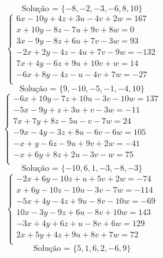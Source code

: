 \documentclass[12pt,oneside,a4paper]{article}
\begin{document}
\begin{equation*}
\text{Solução = }\{-8,-2,-3,-6,8,10\}
\end{equation*}
\vspace{\baselineskip}
\begin{equation*}
\begin{cases}
6x-10y+4z+3u-4v+2w=167 \\
x+10y-8z-7u+9v+8w=0 \\
3x-9y-8z+6u+7v-3w=93 \\
-2x+2y-4z-4u+7v-9w=-132 \\
7x+4y-6z+9u+10v+w=14 \\
-6x+8y-4z-u-4v+7w=-27 \\
\end{cases}
\end{equation*}
\begin{equation*}
\text{Solução = }\{9,-10,-5,-1,-4,10\}
\end{equation*}
\vspace{\baselineskip}
\begin{equation*}
\begin{cases}
-6x+10y-7z+10u-3v-10w=137 \\
-5x-9y+z+3u+v-3w=-11 \\
7x+7y+8z-5u-v-7w=24 \\
-9x-4y-3z+8u-6v-6w=105 \\
-x+y-6z-9u+9v+2w=-41 \\
-x+6y+8z+2u-3v-w=75 \\
\end{cases}
\end{equation*}
\begin{equation*}
\text{Solução = }\{-10,6,1,-3,-8,-3\}
\end{equation*}
\vspace{\baselineskip}
\begin{equation*}
\begin{cases}
-2x+6y-10z+u+5v+2w=-74 \\
x+6y-10z-10u-3v-7w=-114 \\
-5x+4y-4z+9u-8v-10w=-69 \\
10x-3y-9z+6u-8v+10w=143 \\
-3x+4y+6z+u-8v+6w=129 \\
2x+5y+4z+9u+8v+7w=72 \\
\end{cases}
\end{equation*}
\begin{equation*}
\text{Solução = }\{5,1,6,2,-6,9\}
\end{equation*}
\end{document}
